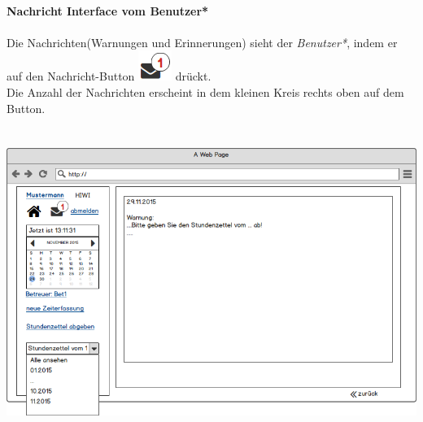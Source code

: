 \newpage
\textbf{\\Nachricht Interface vom Benutzer*}\\
\\
Die Nachrichten(Warnungen und Erinnerungen) sieht der \emph{Benutzer*}, indem er auf den Nachricht-Button
\includegraphics[scale=.4]{UI/Button/Nachricht.png} drückt.\\
Die Anzahl der Nachrichten erscheint in dem kleinen Kreis rechts oben auf dem Button.\\
\\
\\
\includegraphics[width=\linewidth]{UI/Benutzer/Nachricht.png}

\newpage
